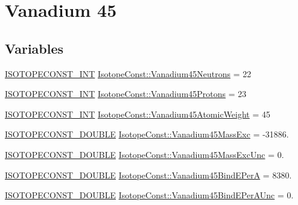 \hypertarget{group___isotope_const-_vanadium-_v45}{}\section{Vanadium 45}
\label{group___isotope_const-_vanadium-_v45}
\subsection*{Variables}
\begin{DoxyCompactItemize}
\item 
\mbox{\hyperlink{group___isotope_const-_macros_ga5f18360b3e99483a35c32d789e62621c}{I\+S\+O\+T\+O\+P\+E\+C\+O\+N\+S\+T\+\_\+\+I\+NT}} \mbox{\hyperlink{group___isotope_const-_vanadium-_v45_ga49907c467ff670772692b827e892794e}{Isotope\+Const\+::\+Vanadium45\+Neutrons}} = 22
\item 
\mbox{\hyperlink{group___isotope_const-_macros_ga5f18360b3e99483a35c32d789e62621c}{I\+S\+O\+T\+O\+P\+E\+C\+O\+N\+S\+T\+\_\+\+I\+NT}} \mbox{\hyperlink{group___isotope_const-_vanadium-_v45_ga9902e16319960ba65a0b8c1c4a7a1dbc}{Isotope\+Const\+::\+Vanadium45\+Protons}} = 23
\item 
\mbox{\hyperlink{group___isotope_const-_macros_ga5f18360b3e99483a35c32d789e62621c}{I\+S\+O\+T\+O\+P\+E\+C\+O\+N\+S\+T\+\_\+\+I\+NT}} \mbox{\hyperlink{group___isotope_const-_vanadium-_v45_gab8a88734c45ade7a54c0fe9fdd32927e}{Isotope\+Const\+::\+Vanadium45\+Atomic\+Weight}} = 45
\item 
\mbox{\hyperlink{group___isotope_const-_macros_ga8f45a7272ce02c0b4c65c44636ed719a}{I\+S\+O\+T\+O\+P\+E\+C\+O\+N\+S\+T\+\_\+\+D\+O\+U\+B\+LE}} \mbox{\hyperlink{group___isotope_const-_vanadium-_v45_ga302fb9d4fddfcd25868f773c4bb211f1}{Isotope\+Const\+::\+Vanadium45\+Mass\+Exc}} = -\/31886.
\item 
\mbox{\hyperlink{group___isotope_const-_macros_ga8f45a7272ce02c0b4c65c44636ed719a}{I\+S\+O\+T\+O\+P\+E\+C\+O\+N\+S\+T\+\_\+\+D\+O\+U\+B\+LE}} \mbox{\hyperlink{group___isotope_const-_vanadium-_v45_ga92ceabf996871c348b1170126836fa8b}{Isotope\+Const\+::\+Vanadium45\+Mass\+Exc\+Unc}} = 0.
\item 
\mbox{\hyperlink{group___isotope_const-_macros_ga8f45a7272ce02c0b4c65c44636ed719a}{I\+S\+O\+T\+O\+P\+E\+C\+O\+N\+S\+T\+\_\+\+D\+O\+U\+B\+LE}} \mbox{\hyperlink{group___isotope_const-_vanadium-_v45_gac4fbf58e721e6c0cd28d10da04dbbd9b}{Isotope\+Const\+::\+Vanadium45\+Bind\+E\+PerA}} = 8380.
\item 
\mbox{\hyperlink{group___isotope_const-_macros_ga8f45a7272ce02c0b4c65c44636ed719a}{I\+S\+O\+T\+O\+P\+E\+C\+O\+N\+S\+T\+\_\+\+D\+O\+U\+B\+LE}} \mbox{\hyperlink{group___isotope_const-_vanadium-_v45_gae94ae5d5df20f29f8ba7efb25bbc4dc9}{Isotope\+Const\+::\+Vanadium45\+Bind\+E\+Per\+A\+Unc}} = 0.

\end{DoxyCompactItemize}
